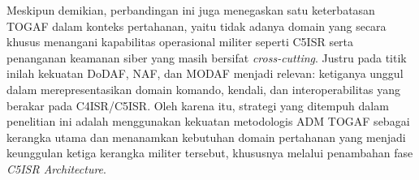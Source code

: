 Meskipun demikian, perbandingan ini juga menegaskan satu keterbatasan TOGAF dalam konteks pertahanan, yaitu tidak adanya domain yang secara khusus menangani kapabilitas operasional militer seperti C5ISR serta penanganan keamanan siber yang masih bersifat \textit{cross-cutting}.
Justru pada titik inilah kekuatan DoDAF, NAF, dan MODAF menjadi relevan: ketiganya unggul dalam merepresentasikan domain komando, kendali, dan interoperabilitas yang berakar pada C4ISR/C5ISR.
Oleh karena itu, strategi yang ditempuh dalam penelitian ini adalah menggunakan kekuatan metodologis ADM TOGAF sebagai kerangka utama dan menanamkan kebutuhan domain pertahanan yang menjadi keunggulan ketiga kerangka militer tersebut, khususnya melalui penambahan fase \textit{C5ISR Architecture}.




























